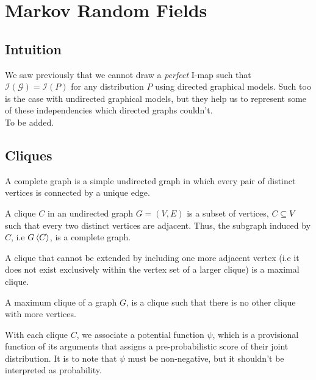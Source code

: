 \section{Markov Random Fields}
\subsection{Intuition}
We saw previously that we cannot draw a \textit{perfect} I-map such that $\mathcal I(\mathcal G) = \mathcal{I}(P)$ for any distribution $P$ using directed graphical models. Such too is the case with undirected graphical models, but they help us to represent some of these independencies which directed graphs couldn't.\\
To be added.

\subsection{Cliques}
\begin{defn}
A complete graph is a simple undirected graph in which every pair of distinct vertices is connected by a unique edge.
\end{defn}

\begin{defn}[Clique]
A clique $C$ in an undirected graph $G = (V,E)$ is a subset of vertices, $C\subseteq V$ such that every two distinct vertices are adjacent. Thus, the subgraph induced by $C$, i.e $G\braket{C}$, is a complete graph.
\end{defn}

\begin{defn}
A clique that cannot be extended by including one more adjacent vertex (i.e it does not exist exclusively within the vertex set of a larger clique) is a maximal clique.		
\end{defn}

\begin{defn}
A maximum clique of a graph $G$, is a clique such that there is no other clique with more vertices.
\end{defn}
With each clique $C$, we associate a potential function $\psi$, which is a provisional function of its arguments that assigns a pre-probabilistic score of their joint distribution. It is to note that $\psi$ must be non-negative, but it shouldn't be interpreted as probability. 

